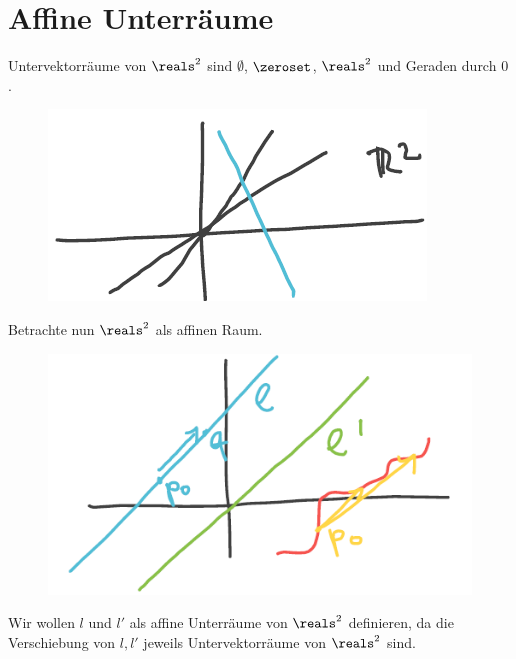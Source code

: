 \section*{Affine Unterräume}
\begin{beispiel*}
    Untervektorräume von \( \reals^2 \) sind \( \emptyset \), \( \zeroset \), \( \reals^2 \) und Geraden durch \( 0 \).
    \begin{figure}[H]
        \centering
        \includegraphics[width=0.4\linewidth]{figures/untervektorraeume_r2}
        \label{fig:untervektorraeume_r2}
    \end{figure}
    Betrachte nun \( \reals^2 \) als affinen Raum.
    \begin{figure}[H]
        \centering
        \includegraphics[width=0.5\linewidth]{figures/affine_unterraeume_r2}
        \label{fig:affine_unterraeume_r2}
    \end{figure}
    \begin{idee*}
        Wir wollen \( l \) und \( l' \) als affine Unterräume von \( \reals^2 \) definieren, da die Verschiebung von \( l, l' \) jeweils Untervektorräume von \( \reals^2 \) sind.
    \end{idee*}
\end{beispiel*}

